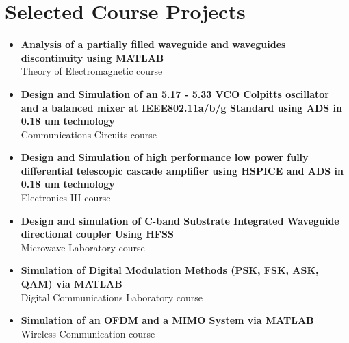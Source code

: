 \documentclass[a4paper,10pt]{article} %
\begin{document}
\color{blue}
\section{Selected Course Projects}
\color{Black}
\begin{itemize}
	\item
	\textbf{Analysis of a partially filled waveguide and waveguides discontinuity using MATLAB}\\
	 Theory of Electromagnetic course
\item
	\textbf{Design and Simulation of an 5.17 - 5.33 VCO Colpitts oscillator and a balanced mixer at IEEE802.11a/b/g Standard using  ADS  in 0.18 um technology  }\\
	Communications Circuits course
	\item
	\textbf{Design and Simulation of high performance low power fully differential telescopic cascade amplifier using HSPICE and ADS  in 0.18 um technology   }\\
	Electronics III course
	\item
	\textbf{Design and simulation of C-band Substrate Integrated Waveguide directional coupler Using HFSS  }\\
	Microwave Laboratory course
		\item
		\textbf{Simulation of Digital Modulation Methods (PSK, FSK, ASK, QAM) via MATLAB}\\
		Digital Communications Laboratory course
		\item
		\textbf{Simulation of an OFDM and a MIMO System via MATLAB}\\
		Wireless Communication course
	\end{itemize}
\color{blue}
\end{document}
